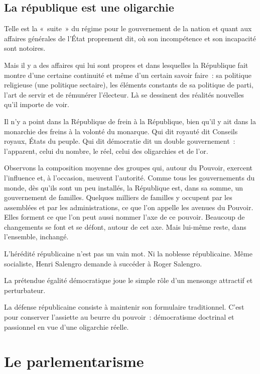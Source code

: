 \documentclass[french,twoside]{book} %
\begin{document}
\subsection[La république est une oligarchie]{La république est une oligarchie}
\noindent Telle est la « suite » du régime pour le gouvernement de la nation et quant aux affaires générales de l’État proprement dit, où son incompétence et son incapacité sont notoires.\par
Mais il y a des affaires qui lui sont propres et dans lesquelles la République fait montre d’une certaine continuité et même d’un certain savoir faire : sa politique religieuse (une politique sectaire), les éléments constants de sa politique de parti, l’art de servir et de rémunérer l’électeur. Là se dessinent des réalités nouvelles qu’il importe de voir.\par
Il n’y a point dans la République de frein à la République, bien qu’il y ait dans la monarchie des freins à la volonté du monarque. Qui dit royauté dit Conseils royaux, États du peuple. Qui dit démocratie dit un double gouvernement : l’apparent, celui du nombre, le réel, celui des oligarchies et de l’or.\par
Observons la composition moyenne des groupes qui, autour du Pouvoir, exercent l’influence et, à l’occasion, meuvent l’autorité. Comme tous les gouvernements du monde, dès qu’ils sont un peu installés, la République est, dans sa somme, un gouvernement de familles. Quelques milliers de familles y occupent par les assemblées et par les administrations, ce que l’on appelle les avenues du Pouvoir. Elles forment ce que l’on peut aussi nommer l’axe de ce pouvoir. Beaucoup de changements se font et se défont, autour de cet axe. Mais lui-même reste, dans l’ensemble, inchangé.\par
L’hérédité républicaine n’est pas un vain mot. Ni la noblesse républicaine. Même socialiste, Henri Salengro demande à succéder à Roger Salengro.\par
La prétendue égalité démocratique joue le simple rôle d’un mensonge attractif et perturbateur.\par
La défense républicaine consiste à maintenir son formulaire traditionnel. C’est pour conserver l’assiette au beurre du pouvoir : démocratisme doctrinal et passionnel en vue d’une oligarchie réelle.
\section[Le parlementarisme]{Le parlementarisme}
\end{document}
